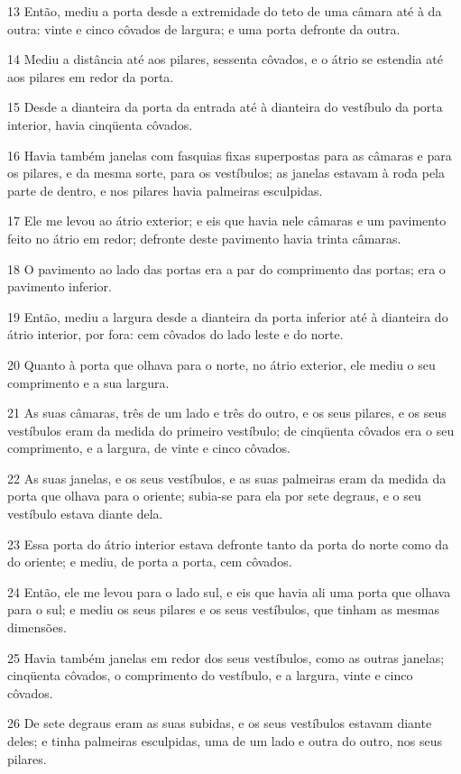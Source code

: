 \par 13 Então, mediu a porta desde a extremidade do teto de uma câmara até à da outra: vinte e cinco côvados de largura; e uma porta defronte da outra.
\par 14 Mediu a distância até aos pilares, sessenta côvados, e o átrio se estendia até aos pilares em redor da porta.
\par 15 Desde a dianteira da porta da entrada até à dianteira do vestíbulo da porta interior, havia cinqüenta côvados.
\par 16 Havia também janelas com fasquias fixas superpostas para as câmaras e para os pilares, e da mesma sorte, para os vestíbulos; as janelas estavam à roda pela parte de dentro, e nos pilares havia palmeiras esculpidas.
\par 17 Ele me levou ao átrio exterior; e eis que havia nele câmaras e um pavimento feito no átrio em redor; defronte deste pavimento havia trinta câmaras.
\par 18 O pavimento ao lado das portas era a par do comprimento das portas; era o pavimento inferior.
\par 19 Então, mediu a largura desde a dianteira da porta inferior até à dianteira do átrio interior, por fora: cem côvados do lado leste e do norte.
\par 20 Quanto à porta que olhava para o norte, no átrio exterior, ele mediu o seu comprimento e a sua largura.
\par 21 As suas câmaras, três de um lado e três do outro, e os seus pilares, e os seus vestíbulos eram da medida do primeiro vestíbulo; de cinqüenta côvados era o seu comprimento, e a largura, de vinte e cinco côvados.
\par 22 As suas janelas, e os seus vestíbulos, e as suas palmeiras eram da medida da porta que olhava para o oriente; subia-se para ela por sete degraus, e o seu vestíbulo estava diante dela.
\par 23 Essa porta do átrio interior estava defronte tanto da porta do norte como da do oriente; e mediu, de porta a porta, cem côvados.
\par 24 Então, ele me levou para o lado sul, e eis que havia ali uma porta que olhava para o sul; e mediu os seus pilares e os seus vestíbulos, que tinham as mesmas dimensões.
\par 25 Havia também janelas em redor dos seus vestíbulos, como as outras janelas; cinqüenta côvados, o comprimento do vestíbulo, e a largura, vinte e cinco côvados.
\par 26 De sete degraus eram as suas subidas, e os seus vestíbulos estavam diante deles; e tinha palmeiras esculpidas, uma de um lado e outra do outro, nos seus pilares.
